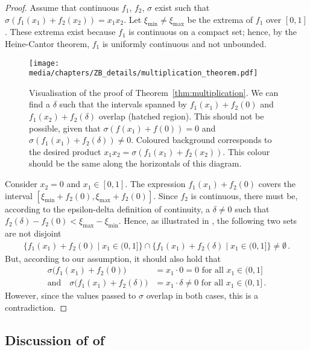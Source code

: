 \begin{proof}
Assume that continuous $f_1$, $f_2$, $\sigma$ exist such that $\sigma(f_1(x_1) + f_2(x_2)) = x_1 x_2$.
Let $\xi_\mathrm{min} \neq \xi_\mathrm{max}$ be the extrema of $f_1$ over $[0, 1]$.
These extrema exist because $f_1$ is continuous on a compact set; hence, by the Heine-Cantor theorem, $f_1$ is uniformly continuous and not unbounded.


\begin{figure}[t]
	\centering
	\texttt{[image: media/chapters/ZB\_details/multiplication\_theorem.pdf]}
	\caption[Visualisation of the proof of Theorem~\ref{thm:multiplication}]{Visualisation of the proof of Theorem~\ref{thm:multiplication}.
	We can find a $\delta$ such that the intervals spanned by $f_1(x_1) + f_2(0)$ and $f_1(x_2) + f_2(\delta)$ overlap (hatched region).
	This should not be possible, given that $\sigma(f(x_1) + f(0)) = 0$ and $\sigma(f_1(x_1) + f_2(\delta)) \neq 0$.
	Coloured background corresponds to the desired product $x_1 x_2 = \sigma(f_1(x_1) + f_2(x_2))$.
	This colour should be the same along the horizontals of this diagram.}
	\label{fig:multiplication_theorem}
\end{figure}

Consider $x_2 = 0$ and $x_1 \in [0, 1]$.
The expression $f_1(x_1) + f_2(0)$ covers the interval $[\xi_\mathrm{min} + f_2(0) , \xi_\mathrm{max} + f_2(0)]$.
Since $f_2$ is continuous, there must be, according to the epsilon-delta definition of continuity, a $\delta \neq 0$ such that $f_2(\delta) - f_2(0) < \xi_\mathrm{max} - \xi_\mathrm{min}$.
Hence, as illustrated in , the following two sets are not disjoint
\begin{align*}
	\bigl\{ f_1(x_1) + f_2(0) \mid x_1 \in (0, 1] \bigr\} \cap \bigl\{ f_1(x_1) + f_2(\delta) \mid x_1 \in (0, 1] \bigr\} \neq \emptyset \,.
\end{align*}
But, according to our assumption, it should also hold that
\begin{align*}
	\sigma\bigl(f_1(x_1) + f_2(0)\bigr) &= x_1 \cdot 0 = 0 \text{ for all } x_1 \in (0, 1] \\
	\text{and} \quad \sigma\bigl(f_1(x_1) + f_2(\delta)\bigr) &= x_1 \cdot \delta \neq 0 \text{ for all } x_1 \in (0, 1] \,.
\end{align*}
However, since the values passed to $\sigma$ overlap in both cases, this is a contradiction. \Lightning
\end{proof}

\subsection{Discussion of of }
\label{app:thm_two_layer_universal}

